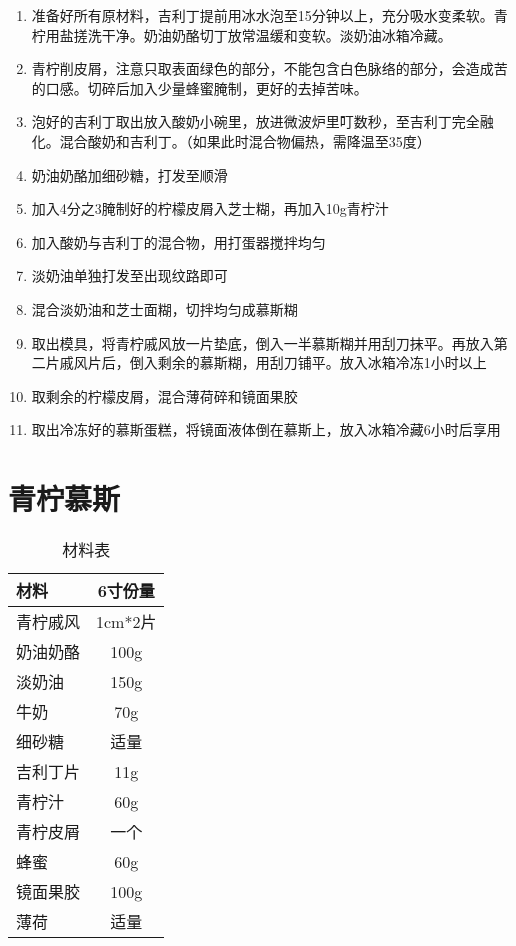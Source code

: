 \begin{enumerate}
    \item 准备好所有原材料，吉利丁提前用冰水泡至15分钟以上，充分吸水变柔软。青柠用盐搓洗干净。奶油奶酪切丁放常温缓和变软。淡奶油冰箱冷藏。
    \item 青柠削皮屑，注意只取表面绿色的部分，不能包含白色脉络的部分，会造成苦的口感。切碎后加入少量蜂蜜腌制，更好的去掉苦味。
    \item 泡好的吉利丁取出放入酸奶小碗里，放进微波炉里叮数秒，至吉利丁完全融化。混合酸奶和吉利丁。（如果此时混合物偏热，需降温至35度）
    \item 奶油奶酪加细砂糖，打发至顺滑
    \item 加入4分之3腌制好的柠檬皮屑入芝士糊，再加入10g青柠汁
    \item 加入酸奶与吉利丁的混合物，用打蛋器搅拌均匀
    \item 淡奶油单独打发至出现纹路即可
    \item 混合淡奶油和芝士面糊，切拌均匀成慕斯糊
    \item 取出模具，将青柠戚风放一片垫底，倒入一半慕斯糊并用刮刀抹平。再放入第二片戚风片后，倒入剩余的慕斯糊，用刮刀铺平。放入冰箱冷冻1小时以上
    \item 取剩余的柠檬皮屑，混合薄荷碎和镜面果胶
    \item 取出冷冻好的慕斯蛋糕，将镜面液体倒在慕斯上，放入冰箱冷藏6小时后享用
\end{enumerate}


\section{青柠慕斯}

\begin{table}[H]
    \centering
    \begin{tabular}{|l||c|}\hline
     \textbf{材料}    &  \textbf{6寸份量}\\ \hline\hline
    青柠戚风 & 1cm*2片 \\ \hline
    奶油奶酪 &  100g\\ \hline
    淡奶油 &  150g\\ \hline
    牛奶 & 70g \\ \hline
    细砂糖  &  适量\\ \hline
    吉利丁片  &  11g \\ \hline
    青柠汁  & 60g\\ \hline
    青柠皮屑 & 一个 \\ \hline
    蜂蜜 & 60g \\ \hline
    镜面果胶 & 100g \\ \hline
    薄荷 & 适量 \\ \hline
    \end{tabular}
    \caption{材料表}
\end{table}

